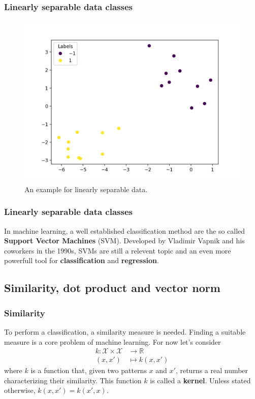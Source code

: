 \documentclass{beamer}
\begin{document}
\begin{frame}{}
	\frametitle{Linearly separable data classes}
	\begin{figure}
		\centering
		\includegraphics[width=0.7\linewidth]{img/LinearSVM_Data_Labels.png}
		\caption{ An example for linearly separable data.}
		\label{fig:lineardata}
	\end{figure} 
\end{frame}


\begin{frame}{}
    \frametitle{Linearly separable data classes}
    In machine learning, a well established classification method are the so called \textbf{Support Vector Machines} (SVM). Developed by Vladimir Vapnik and his coworkers in the 1990s, SVMs are still a relevent topic and an even more powerfull tool for \textbf{classification} and \textbf{regression}.
\end{frame}


\subsection{Similarity, dot product and vector norm}

\begin{frame}{}
    \frametitle{Similarity}
    To perform a classification, a similarity measure is needed. Finding a suitable measure is a core problem of machine learning. For now let's consider 
    \begin{equation}
        \begin{aligned}
            k: \mathcal{X} \times \mathcal{X} & \rightarrow \mathbb{R} \\
            (x, x') & \mapsto k(x, x')
        \end{aligned}
    \end{equation}
    where $k$ is a function that, given two patterns $x$ and $x'$, returns a real number characterizing their similarity. This function $k$ is called a \textbf{kernel}. Unless stated otherwise, $k(x, x') = k(x', x)$.
\end{frame}
\end{document}
